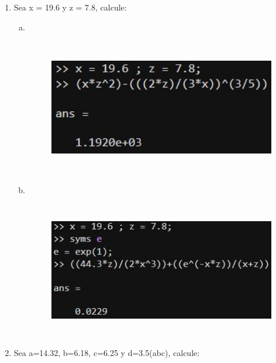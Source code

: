 \documentclass{article}
\begin{document}
\begin{enumerate}
\begin{enumerate}[a)]
    \end{enumerate}
    
    \newpage
    
    \item 

    Sea x = 19.6 y z = 7.8, calcule:

    \begin{enumerate}[a)]

        \item 
        \
        \begin{figure}[H]
        \centering
        \includegraphics[height=6cm]{img6a.jpg}
        \end{figure}

        \item 
        \
        \begin{figure}[H]
        \centering
        \includegraphics[height=6cm]{img6b.jpg}
        \end{figure}

    \end{enumerate}
    
    \item 

    Sea a=14.32, b=6.18, c=\text{-}6.25 y d=3.5(ab\text{-}c), calcule:

    \begin{enumerate}[a)]


\end{enumerate}
\end{enumerate}
\end{document}
